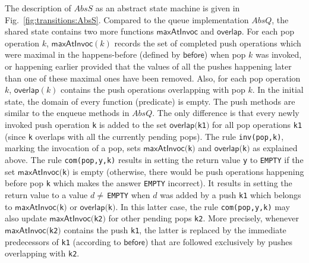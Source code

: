 The description of $AbsS$ as an abstract state machine is given in Fig.~\ref{fig:transitions:AbsS}. Compared to the queue implementation $AbsQ$, the shared state contains two more functions $\mathsf{maxAtInvoc}$ and $\mathsf{overlap}$. For each pop operation $k$, $\mathsf{maxAtInvoc}(k)$ records the set of completed push operations which were maximal in the happens-before (defined by $\mathsf{before}$) when pop $k$ was invoked, or happening earlier provided that the values of all the pushes happening later than one of these maximal ones have been removed. Also, for each pop operation $k$, $\mathsf{overlap}(k)$ contains the push operations overlapping with pop $k$.
In the initial state, the domain of every function (predicate) is empty. The push methods are similar to the enqueue methods in $AbsQ$. The only difference is that every newly invoked push operation {\tt k} is added to the set $\mathsf{overlap}(${\tt k1}$)$ for all pop operations {\tt k1} (since {\tt k} overlaps with all the currently pending pops). The rule {\tt inv(pop,k)}, marking the invocation of a pop, sets $\mathsf{maxAtInvoc}(${\tt k}$)$ and $\mathsf{overlap}(${\tt k}$)$ as explained above. The rule {\tt com(pop,y,k)} results in setting the return value {\tt y} to {\tt EMPTY} if the set $\mathsf{maxAtInvoc}(${\tt k}$)$ is empty (otherwise, there would be push operations happening before pop {\tt k} which makes the answer {\tt EMPTY} incorrect). It results in setting the return value to a value $d\neq\,${\tt EMPTY} when $d$ was added by a push {\tt k1} which belongs to $\mathsf{maxAtInvoc}(${\tt k}$)$ or $\mathsf{overlap}(${\tt k}$)$. In this latter case, the rule {\tt com(pop,y,k)} may also update $\mathsf{maxAtInvoc}(${\tt k2}$)$ for other pending pops {\tt k2}. More precisely, whenever $\mathsf{maxAtInvoc}(${\tt k2}$)$ contains the push {\tt k1}, the latter is replaced by the immediate predecessors of {\tt k1} (according to $\mathsf{before}$) that are followed exclusively by pushes overlapping with {\tt k2}.

